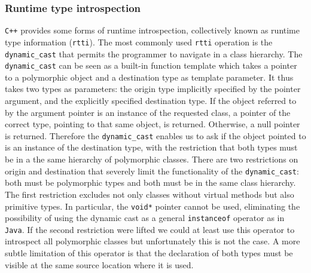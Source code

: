 \subsubsection{Runtime type introspection}

\texttt{C++} provides some forms of runtime introspection, collectively known as runtime type information (\texttt{rtti}). The most commonly
used \texttt{rtti} operation is the \texttt{dynamic\_cast} that permits the programmer to navigate in a class hierarchy.
The \texttt{dynamic\_cast} can be seen as a built-in function template which takes a pointer to a polymorphic object and a destination type
as template parameter. It thus takes two types as parameters: the origin type implicitly specified by the pointer argument, and the
explicitly specified destination type. If the object referred to by the argument pointer is an instance of the requested class, a pointer of
the correct type, pointing to that same object, is returned. Otherwise, a null pointer is returned. Therefore the \texttt{dynamic\_cast}
enables us to ask if the object pointed to is an instance of the destination type, with the restriction that both types must be in a the same
hierarchy of polymorphic classes. There are two restrictions on origin and destination that severely limit the functionality of the
\texttt{dynamic\_cast}: both must be polymorphic types and both must be in the same class hierarchy. The first restriction excludes not
only classes without virtual methods but also primitive types. In particular, the \texttt{void*} pointer cannot be used, eliminating
the possibility of using the dynamic cast as a general \texttt{instanceof} operator as in \texttt{Java}. If the second restriction were lifted
we could at least use this operator to introspect all polymorphic classes but unfortunately this is not the case. A more subtle limitation
of this operator is that the declaration of both types must be visible at the same source location where it is used.

